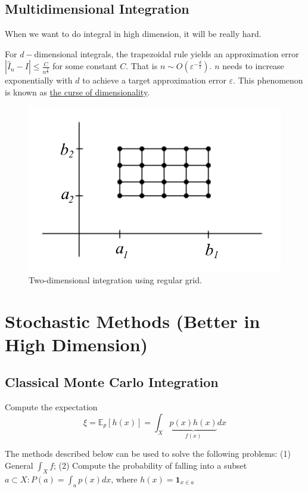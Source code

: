 \documentclass[11pt]{elegantbook}
\begin{document}
\subsection{Multidimensional Integration}
When we want to do integral in high dimension, it will be really hard.

For $d-$dimensional integrals, the trapezoidal rule yields an approximation error $|\hat{I}_n-I|\leq \frac{C}{n^\frac{2}{d}}$ for some constant $C$. That is $n\sim O\left(\varepsilon^{-\frac{d}{2}}\right)$. $n$ needs to increase exponentially with $d$ to achieve a target approximation error $\varepsilon$. This phenomenon is known as \underline{the curse of dimensionality}.
\begin{center}\begin{figure}[htbp]
    \centering
    \includegraphics[scale=0.3]{two-dim int.png}
    \caption{Two-dimensional integration using regular grid.}
    \label{}
\end{figure}\end{center}




\section{Stochastic Methods (Better in High Dimension)}
\subsection{Classical Monte Carlo Integration}

Compute the expectation $$\xi=\mathbb{E}_p[h(x)]=\int_X \underbrace{p(x)h(x)}_{f(x)}dx$$

The methods described below can be used to solve the following problems: (1) General $\int_X f$; (2) Compute the probability of falling into a subset $a\subset X :P(a)=\int_a p(x)dx$, where $h(x)=\mathbf{1}_{x\in a}$
\end{document}
